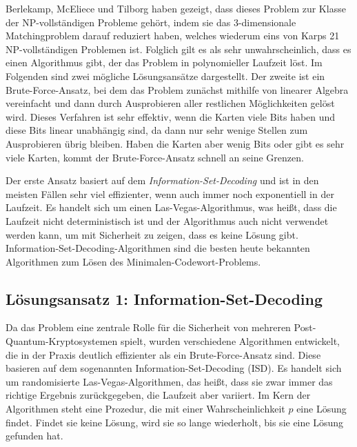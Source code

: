 \documentclass[a4paper,10pt,ngerman]{scrartcl}
\begin{document}
Berlekamp, McEliece und Tilborg \cite{berlekampInherentIntractabilityCertain1978} haben gezeigt, dass dieses Problem zur Klasse der NP-vollständigen Probleme gehört, indem sie das 3-dimensionale Matchingproblem darauf reduziert haben, welches wiederum eins von Karps 21 NP-vollständigen Problemen ist.
Folglich gilt es als sehr unwahrscheinlich, dass es einen Algorithmus gibt, der das Problem in polynomieller Laufzeit löst. 
Im Folgenden sind zwei mögliche Lösungsansätze dargestellt. 
Der zweite ist ein Brute-Force-Ansatz, bei dem das Problem zunächst mithilfe von linearer Algebra vereinfacht und dann durch Ausprobieren aller restlichen Möglichkeiten gelöst wird.
Dieses Verfahren ist sehr effektiv, wenn die Karten viele Bits haben und diese Bits linear unabhängig sind, da dann nur sehr wenige Stellen zum Ausprobieren übrig bleiben. Haben die Karten aber wenig Bits oder gibt es sehr viele Karten, kommt der Brute-Force-Ansatz schnell an seine Grenzen.

Der erste Ansatz basiert auf dem \textit{Information-Set-Decoding} und ist in den meisten Fällen sehr viel effizienter, wenn auch immer noch exponentiell in der Laufzeit. Es handelt sich um einen Las-Vegas-Algorithmus, was heißt, dass die Laufzeit nicht deterministisch ist und der Algorithmus auch nicht verwendet werden kann, um mit Sicherheit zu zeigen, dass es keine Lösung gibt. 
Information-Set-Decoding-Algorithmen sind die besten heute bekannten Algorithmen zum Lösen des Minimalen-Codewort-Problems.

\subsection{Lösungsansatz 1: Information-Set-Decoding}
Da das Problem eine zentrale Rolle für die Sicherheit von mehreren Post-Quantum-Kryptosystemen spielt, wurden verschiedene Algorithmen entwickelt, die in der Praxis deutlich effizienter als ein Brute-Force-Ansatz sind. 
Diese basieren auf dem sogenannten Information-Set-Decoding (ISD). 
Es handelt sich um randomisierte Las-Vegas-Algorithmen, das heißt, dass sie zwar immer das richtige Ergebnis zurückgegeben, die Laufzeit aber variiert. 
Im Kern der Algorithmen steht eine Prozedur, die mit einer Wahrscheinlichkeit $p$ eine Lösung findet. Findet sie keine Lösung, wird sie so lange wiederholt, bis sie eine Lösung gefunden hat. 
\end{document}
